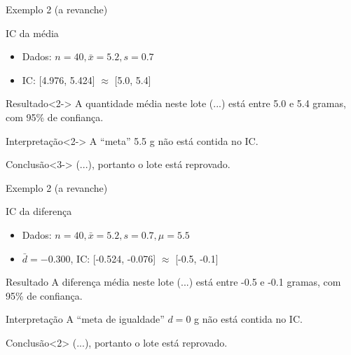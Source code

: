 \documentclass{beamer}
\begin{document}
\begin{frame}{Exemplo 2 (a revanche)}
  \begin{exampleblock}{IC da média}
    \begin{itemize}
      \scriptsize
    \item Dados: $n=40, \bar{x} = 5.2, s = 0.7$
    \item IC: [4.976, 5.424] $\approx$ [5.0, 5.4]
    \end{itemize}
  \end{exampleblock}
  \begin{exampleblock}{Resultado}<2->
    \footnotesize
    A quantidade média neste lote (...)
    está entre 5.0 e 5.4 gramas, com 95\% de confiança.
  \end{exampleblock}
  \begin{block}{Interpretação}<2->
    \footnotesize
    A ``meta'' 5.5 g não está contida no IC.
  \end{block}
  \begin{exampleblock}{Conclusão}<3->
    (...), portanto o lote está reprovado.
  \end{exampleblock}
\end{frame}

\begin{frame}{Exemplo 2 (a revanche)}
  \begin{exampleblock}{IC da diferença}
    \begin{itemize}
      \scriptsize
    \item Dados: $n=40, \bar{x} = 5.2, s = 0.7, \mu = 5.5$
    \item $\bar{d} = -0.300$, IC: [-0.524, -0.076] $\approx$ [-0.5, -0.1]
    \end{itemize}
  \end{exampleblock}
  \begin{exampleblock}{Resultado}
    \footnotesize
    A diferença média neste lote (...)
    está entre -0.5 e -0.1 gramas, com 95\% de confiança.
  \end{exampleblock}
  \begin{block}{Interpretação}
    \footnotesize
    A ``meta de igualdade'' $d = 0$ g não está contida no IC.
  \end{block}
  \begin{exampleblock}{Conclusão}<2>
    (...), portanto o lote está reprovado.
  \end{exampleblock}
\end{frame}
\end{document}
